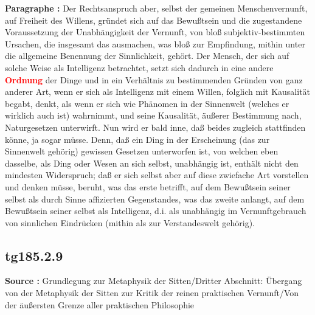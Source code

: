 \documentclass[a4paper,12pt,twoside]{book}
\newcommand{\match}[1]{\textcolor{red}{\textbf{#1}}}
\begin{document}
	\noindent\textbf{Paragraphe : }
	Der Rechtsanspruch aber, selbst der gemeinen Menschenvernunft, auf Freiheit des Willens, gründet sich auf das Bewußtsein und die zugestandene Voraussetzung der Unabhängigkeit der Vernunft, von bloß subjektiv-bestimmten Ursachen, die insgesamt das ausmachen, was bloß zur Empfindung, mithin unter die allgemeine Benennung der Sinnlichkeit, gehört. Der Mensch, der sich auf solche Weise als Intelligenz betrachtet, setzt sich dadurch in eine andere \match{Ordnung} der Dinge und in ein Verhältnis zu bestimmenden Gründen von ganz anderer Art, wenn er sich als Intelligenz mit einem Willen, folglich mit Kausalität begabt, denkt, als wenn er sich wie Phänomen in der Sinnenwelt (welches er wirklich auch ist) wahrnimmt, und seine Kausalität, äußerer Bestimmung nach, Naturgesetzen unterwirft. Nun wird er bald inne, daß beides zugleich stattfinden könne, ja sogar müsse. Denn, daß ein Ding in der Erscheinung (das zur Sinnenwelt gehörig) gewissen Gesetzen unterworfen ist, von welchen eben dasselbe, als Ding oder Wesen an sich selbst, unabhängig ist, enthält nicht den mindesten Widerspruch; daß er sich selbst aber auf diese zwiefache Art vorstellen und denken müsse, beruht, was das erste betrifft, auf dem Bewußtsein seiner selbst als durch Sinne affizierten Gegenstandes, was das zweite anlangt, auf dem Bewußtsein seiner selbst als Intelligenz, d.i. als unabhängig im Vernunftgebrauch von sinnlichen Eindrücken (mithin als zur Verstandeswelt gehörig). 
	
	\subsection*{tg185.2.9} 
	\textbf{Source : }Grundlegung zur Metaphysik der Sitten/Dritter Abschnitt: Übergang von der Metaphysik der Sitten zur Kritik der reinen praktischen Vernunft/Von der äußersten Grenze aller praktischen Philosophie\\  
	
\end{document}
